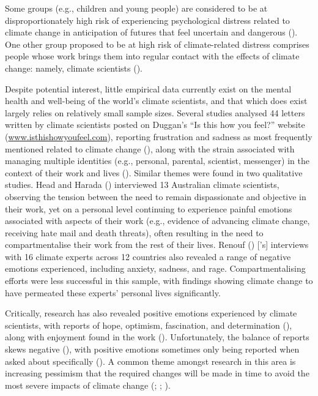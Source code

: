 \documentclass[
  man,
  longtable,
  nolmodern,
  notxfonts,
  notimes,
  colorlinks=true,linkcolor=blue,citecolor=blue,urlcolor=blue]{apa7}
\begin{document}
Some groups (e.g., children and young people) are considered to be at
disproportionately high risk of experiencing psychological distress
related to climate change in anticipation of futures that feel uncertain
and dangerous (). One other group proposed to be at high risk of
climate-related distress comprises people whose work brings them into
regular contact with the effects of climate change: namely, climate
scientists ().

Despite potential interest, little empirical data currently exist on the
mental health and well-being of the world's climate scientists, and that
which does exist largely relies on relatively small sample sizes.
Several studies analysed 44 letters written by climate scientists posted
on Duggan's ``Is this how you feel?'' website
(\url{www.isthishowyoufeel.com}), reporting frustration and sadness as
most frequently mentioned related to climate change
(), along with the
strain associated with managing multiple identities (e.g., personal,
parental, scientist, messenger) in the context of their work and lives
(). Similar themes were
found in two qualitative studies. Head and Harada
() interviewed 13 Australian
climate scientists, observing the tension between the need to remain
dispassionate and objective in their work, yet on a personal level
continuing to experience painful emotions associated with aspects of
their work (e.g., evidence of advancing climate change, receiving hate
mail and death threats), often resulting in the need to compartmentalise
their work from the rest of their lives. Renouf
() {[}'s{]} interviews with 16
climate experts across 12 countries also revealed a range of negative
emotions experienced, including anxiety, sadness, and rage.
Compartmentalising efforts were less successful in this sample, with
findings showing climate change to have permeated these experts'
personal lives significantly.

Critically, research has also revealed positive emotions experienced by
climate scientists, with reports of hope, optimism, fascination, and
determination (), along
with enjoyment found in the work (). Unfortunately, the balance of reports skews negative
(), with
positive emotions sometimes only being reported when asked about
specifically (). A common
theme amongst research in this area is increasing pessimism that the
required changes will be made in time to avoid the most severe impacts
of climate change (; ;
).
\end{document}
